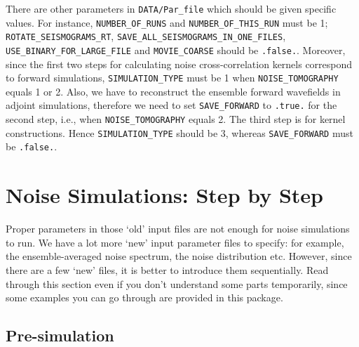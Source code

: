 \documentclass[oneside,english]{book}
\begin{document}
There are other parameters in \texttt{DATA/Par\_file} which should be given specific values.
For instance, \texttt{NUMBER\_OF\_RUNS} and \texttt{NUMBER\_OF\_THIS\_RUN} must be 1;
\texttt{ROTATE\_SEISMOGRAMS\_RT}, \texttt{SAVE\_ALL\_SEISMOGRAMS\_IN\_ONE\_FILES},
\texttt{USE\_BINARY\_FOR\_LARGE\_FILE} and \texttt{MOVIE\_COARSE} should be \texttt{.false.}.
Moreover, since the first two steps for calculating noise cross-correlation kernels correspond to
forward simulations, \texttt{SIMULATION\_TYPE} must be 1 when \texttt{NOISE\_TOMOGRAPHY} equals 1 or 2.
Also, we have to reconstruct the ensemble forward wavefields in adjoint simulations,
therefore we need to set \texttt{SAVE\_FORWARD} to \texttt{.true.} for the second step,
i.e., when \texttt{NOISE\_TOMOGRAPHY} equals 2.
The third step is for kernel constructions. Hence \texttt{SIMULATION\_TYPE} should be 3, whereas
\texttt{SAVE\_FORWARD} must be \texttt{.false.}.\\


\section{Noise Simulations: Step by Step}

Proper parameters in those `old' input files are not enough for noise simulations to run.
We have a lot more `new' input parameter files to specify:
for example, the ensemble-averaged noise spectrum, the noise distribution etc.
However, since there are a few `new' files, it is better to introduce them sequentially.
Read through this section even if you don't understand some parts temporarily,
since some examples you can go through are provided in this package.

\subsection{Pre-simulation}
\end{document}
